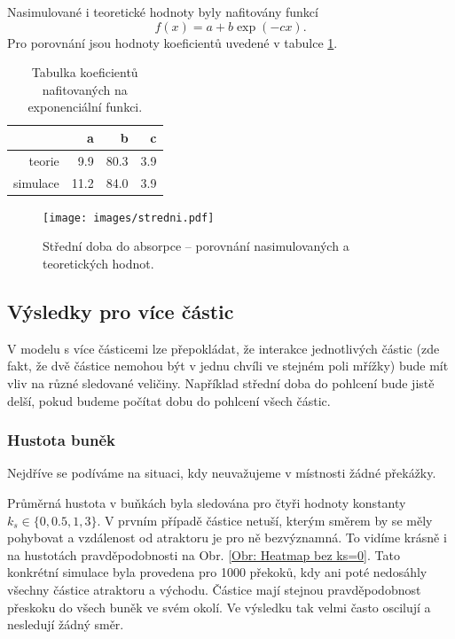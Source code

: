 \documentclass[a4paper, 12pt, fleqn]{article}
\begin{document}
	Nasimulované i teoretické hodnoty byly nafitovány funkcí
	\[ f(x) = a + b \exp(-cx). \]
	Pro porovnání jsou hodnoty koeficientů uvedené v tabulce \ref{Tab: koeficienty}.
	
	\begin{table}[h]
		\centering
		\begin{tabular}{rrrr}
			\toprule
			& a & b & c  \\ \toprule
			teorie & 9.9 & 80.3 & 3.9 \\ \midrule
			simulace & 11.2 & 84.0 & 3.9 \\ \bottomrule
		\end{tabular}
		\caption{Tabulka koeficientů nafitovaných na exponenciální funkci.}
		\label{Tab: koeficienty}
	\end{table}
	
	\begin{figure}
		\centering
		\texttt{[image: images/stredni.pdf]}
		\caption{Střední doba do absorpce -- porovnání nasimulovaných a teoretických hodnot.}
		\label{Obr: MAT}
	\end{figure}
	
	\pagebreak
	\subsection{Výsledky pro více částic}
	
	V modelu s více částicemi lze přepokládat, že interakce jednotlivých částic (zde fakt, že dvě částice nemohou být v jednu chvíli ve stejném poli mřížky) bude mít vliv na různé sledované veličiny. Například střední doba do pohlcení bude jistě delší, pokud budeme počítat dobu do pohlcení všech částic.
	
	\subsubsection{Hustota buněk}
	
	Nejdříve se podíváme na situaci, kdy neuvažujeme v místnosti žádné překážky.
	
	Průměrná hustota v buňkách byla sledována pro čtyři hodnoty konstanty $k_s \in \{0,0.5,1,3\}$. V prvním případě částice netuší, kterým směrem by se měly pohybovat a vzdálenost od atraktoru je pro ně bezvýznamná. To vidíme krásně i na hustotách pravděpodobnosti na Obr. \ref{Obr: Heatmap bez ks=0}. Tato konkrétní simulace byla provedena pro 1000 překoků, kdy ani poté nedosáhly všechny částice atraktoru a východu. Částice mají stejnou pravděpodobnost přeskoku do všech buněk ve svém okolí. Ve výsledku tak velmi často oscilují a nesledují žádný směr.
	
\end{document}
